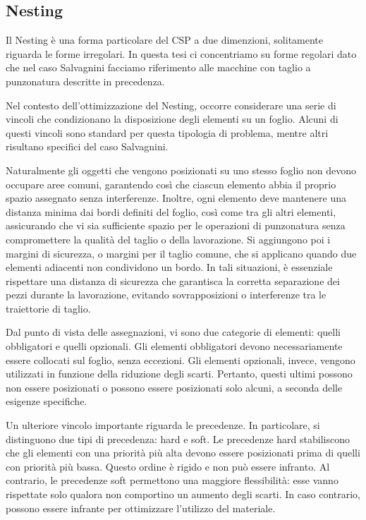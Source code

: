 
\subsection{Nesting}

Il Nesting è una forma particolare del CSP a due dimenzioni, solitamente riguarda le forme irregolari. In questa tesi ci concentriamo su forme regolari dato che nel caso Salvagnini facciamo riferimento alle macchine con taglio a punzonatura descritte in precedenza. 

Nel contesto dell’ottimizzazione del Nesting, occorre considerare una serie di vincoli che condizionano la disposizione degli elementi su un foglio. Alcuni di questi vincoli sono standard per questa tipologia di problema, mentre altri risultano specifici del caso Salvagnini. 

Naturalmente gli oggetti che vengono posizionati su uno stesso foglio non devono occupare aree comuni, garantendo così che ciascun elemento abbia il proprio spazio assegnato senza interferenze. Inoltre, ogni elemento deve mantenere una distanza minima dai bordi definiti del foglio, così come tra gli altri elementi, assicurando che vi sia sufficiente spazio per le operazioni di punzonatura senza compromettere la qualità del taglio o della lavorazione. Si aggiungono poi i margini di sicurezza, o margini per il taglio comune, che si applicano quando due elementi adiacenti non condividono un bordo. In tali situazioni, è essenziale rispettare una distanza di sicurezza che garantisca la corretta separazione dei pezzi durante la lavorazione, evitando sovrapposizioni o interferenze tra le traiettorie di taglio.

Dal punto di vista delle assegnazioni, vi sono due categorie di elementi: quelli obbligatori e quelli opzionali. Gli elementi obbligatori devono necessariamente essere collocati sul foglio, senza eccezioni. Gli elementi opzionali, invece, vengono utilizzati in funzione della riduzione degli scarti. Pertanto, questi ultimi possono non essere posizionati o possono essere posizionati solo alcuni, a seconda delle esigenze specifiche.

Un ulteriore vincolo importante riguarda le precedenze. In particolare, si distinguono due tipi di precedenza: hard e soft. Le precedenze hard stabiliscono che gli elementi con una priorità più alta devono essere posizionati prima di quelli con priorità più bassa. Questo ordine è rigido e non può essere infranto. Al contrario, le precedenze soft permettono una maggiore flessibilità: esse vanno rispettate solo qualora non comportino un aumento degli scarti. In caso contrario, possono essere infrante per ottimizzare l’utilizzo del materiale.

